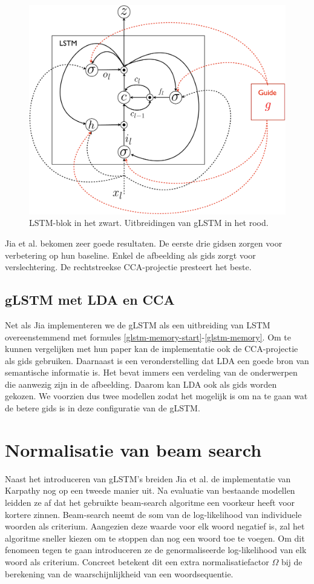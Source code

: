 \begin{figure}[tb][h]
	\centering
	\includegraphics[width=\linewidth]{Images/glstm.pdf}
	\caption{LSTM-blok in het zwart. Uitbreidingen van gLSTM in het rood.}
	\label{fig:glstm}
\end{figure}

Jia et al. bekomen zeer goede resultaten. De eerste drie gidsen zorgen voor verbetering op hun baseline. Enkel de afbeelding als gids zorgt voor verslechtering. De rechtstreekse CCA-projectie presteert het beste.

\subsection{gLSTM met LDA en CCA}
Net als Jia implementeren we de gLSTM als een uitbreiding van LSTM overeenstemmend met formules \ref{glstm-memory-start}-\ref{glstm-memory}.
Om te kunnen vergelijken met hun paper kan de implementatie ook de CCA-projectie als gids gebruiken.
Daarnaast is een veronderstelling dat LDA een goede bron van semantische informatie is. Het bevat immers een verdeling van de onderwerpen die aanwezig zijn in de afbeelding. Daarom kan LDA ook als gids worden gekozen.
We voorzien dus twee modellen zodat het mogelijk is om na te gaan wat de betere gids is in deze configuratie van de gLSTM.

\section{Normalisatie van beam search}
Naast het introduceren van gLSTM's breiden Jia et al. \cite{Fernando2015} de implementatie van Karpathy nog op een tweede manier uit. Na evaluatie van bestaande modellen leidden ze af dat het gebruikte beam-search algoritme een voorkeur heeft voor kortere zinnen. Beam-search neemt de som van de log-likelihood van individuele woorden als criterium. Aangezien deze waarde voor elk woord negatief is, zal het algoritme sneller kiezen om te stoppen dan nog een woord toe te voegen. Om dit fenomeen tegen te gaan introduceren ze de genormaliseerde log-likelihood van elk woord als criterium. Concreet betekent dit een extra normalisatiefactor $\Omega$ bij de berekening van de waarschijnlijkheid van een woordsequentie.

